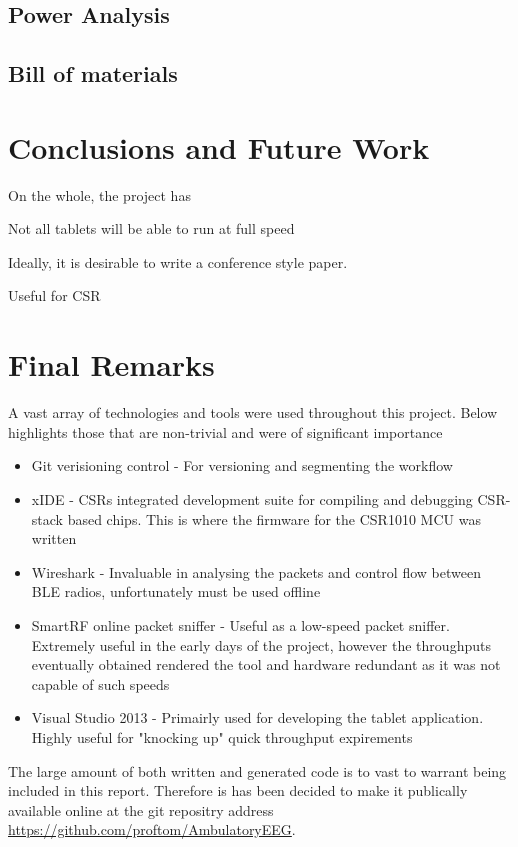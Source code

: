 \documentclass[]{article}
\begin{document}
\subsection{Power Analysis}

\subsection{Bill of materials}

\section{Conclusions and Future Work}
On the whole, the project has 

Not all tablets will be able to run at full speed

Ideally, it is desirable to write a conference style paper. 

Useful for CSR
\section{Final Remarks}
A vast array of technologies and tools were used throughout this project. Below highlights those that are non-trivial and were of significant importance

\begin{itemize}
	\item Git verisioning control - For versioning and segmenting the workflow
	\item xIDE - CSRs integrated development suite for compiling and debugging CSR-stack based chips. This is where the firmware for the CSR1010 MCU was written
	\item Wireshark - Invaluable in analysing the packets and control flow between BLE radios, unfortunately must be used offline
	\item SmartRF online packet sniffer - Useful as a low-speed packet sniffer. Extremely useful in the early days of the project, however the throughputs eventually obtained rendered the tool and hardware redundant as it was not capable of such speeds
	\item Visual Studio 2013 - Primairly used for developing the tablet application. Highly useful for "knocking up" quick throughput expirements 
\end{itemize}

The large amount of both written and generated code is to vast to warrant being included in this report. Therefore is has been decided to make it publically available online at the git repositry address 
\url{https://github.com/proftom/AmbulatoryEEG}.
\end{document}
